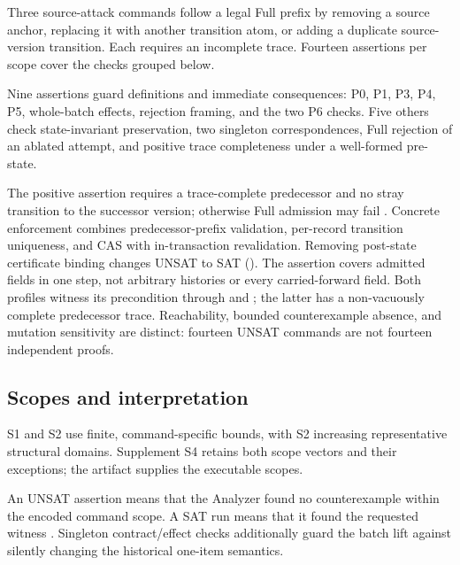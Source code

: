 Three source-attack commands follow a legal Full prefix by removing a source anchor, replacing it with another transition atom, or adding a duplicate source-version transition. Each requires an incomplete trace. Fourteen assertions per scope cover the checks grouped below.

Nine assertions guard definitions and immediate consequences: P0, P1, P3, P4, P5, whole-batch effects, rejection framing, and the two P6 checks. Five others check state-invariant preservation, two singleton correspondences, Full rejection of an ablated attempt, and positive trace completeness under a well-formed pre-state.

The positive assertion requires a trace-complete predecessor and no stray transition to the successor version; otherwise Full admission may fail . Concrete enforcement combines predecessor-prefix validation, per-record transition uniqueness, and CAS with in-transaction revalidation. Removing post-state certificate binding changes UNSAT to SAT (). The assertion covers admitted fields in one step, not arbitrary histories or every carried-forward field. Both profiles witness its precondition through  and ; the latter has a non-vacuously complete predecessor trace. Reachability, bounded counterexample absence, and mutation sensitivity are distinct: fourteen UNSAT commands are not fourteen independent proofs.

\subsection{Scopes and interpretation}

S1 and S2 use finite, command-specific bounds, with S2 increasing representative structural domains. Supplement S4 retains both scope vectors and their exceptions; the artifact supplies the executable scopes.



An UNSAT assertion means that the Analyzer found no counterexample within the encoded command scope. A SAT run means that it found the requested witness \citep{jackson2002alloy,torlak2007kodkod}. Singleton contract/effect checks additionally guard the batch lift against silently changing the historical one-item semantics.
